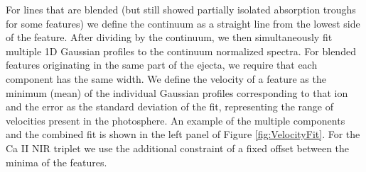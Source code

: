 \documentclass[a4paper,fleqn,usenatbib]{mnras}
\begin{document}
For lines that are blended (but still showed partially isolated absorption troughs for some features) we define the continuum as a straight line from the lowest side of the feature. 
After dividing by the continuum, we then simultaneously fit multiple 1D Gaussian profiles to the continuum normalized spectra. 
For blended features originating in the same part of the ejecta, we require that each component has the same width.
We define the velocity of a feature as the minimum (mean) of the individual Gaussian profiles corresponding to that ion and the error as the standard deviation of the fit, representing the range of velocities present in the photosphere. 
An example of the multiple components and the combined fit is shown in the left panel of Figure \ref{fig:VelocityFit}.
For the Ca II NIR triplet we use the additional constraint of a fixed offset between the minima of the features. 
\end{document}
